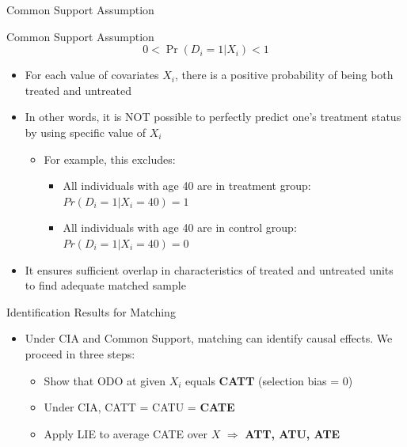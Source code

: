\documentclass[dvipsnames,hyperref={pdfpagelabels=false}]{beamer}
\begin{document}
\begin{frame}{Common Support Assumption}
	\begin{block}{Common Support Assumption}	
		\begin{equation*}
		0<\Pr(D_{i}=1|X_{i})<1  	
		\end{equation*}
	\end{block}
	\begin{itemize}
		\item For each value of covariates $X_{i}$, there is a positive probability of being both treated and untreated 
		\vspace{0.2cm}
		\item In other words, it is NOT possible to perfectly predict one's treatment status by using specific value of $X_{i}$
		\vspace{0.2cm}
		\begin{itemize}	
			\item For example, this excludes:
			\vspace{0.2cm}
					\begin{itemize}	
			\item All individuals with age 40 are in treatment group: $Pr(D_{i}=1|X_{i}=40)=1$
				\vspace{0.2cm}
			\item All individuals with age 40 are in control group: $Pr(D_{i}=1|X_{i}=40)=0$
				\end{itemize}
		\end{itemize}
				\vspace{0.2cm}
		\item It ensures sufficient overlap in characteristics of treated and untreated units to find adequate matched sample	
		
	\end{itemize}
\end{frame}





\begin{frame}{Identification Results for Matching}

	\begin{itemize}
		\item Under CIA and Common Support, matching can identify causal effects. We proceed in three steps:
		\vspace{0.3cm}
		\begin{itemize}
			\item[\textbf{Step 1}] Show that ODO at given $X_i$ equals \textbf{CATT} (selection bias = 0)
			\vspace{0.2cm}
			\item[\textbf{Step 2}] Under CIA, CATT = CATU = \textbf{CATE}
			\vspace{0.2cm}
			\item[\textbf{Step 3}] Apply LIE to average CATE over $X$ $\Rightarrow$ \textbf{ATT, ATU, ATE}
		\end{itemize}
	\end{itemize}
	
\end{frame}
\end{document}
